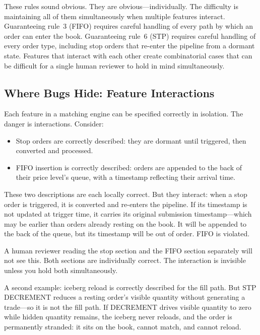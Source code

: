 \documentclass[11pt,a4paper]{article}
\begin{document}
These rules sound obvious. They are obvious---individually. The
difficulty is maintaining all of them simultaneously when multiple
features interact. Guaranteeing rule~3 (FIFO) requires careful handling
of every path by which an order can enter the book. Guaranteeing
rule~6 (STP) requires careful handling of every order type, including
stop orders that re-enter the pipeline from a dormant state. Features
that interact with each other create combinatorial cases that can be
difficult for a single human reviewer to hold in mind simultaneously.

\subsection{Where Bugs Hide: Feature Interactions}
\label{sec:feature-interactions}

Each feature in a matching engine can be specified correctly in
isolation. The danger is interactions. Consider:

\begin{itemize}[nosep]
\item Stop orders are correctly described: they are dormant until
      triggered, then converted and processed.
\item FIFO insertion is correctly described: orders are appended to the
      back of their price level's queue, with a timestamp reflecting
      their arrival time.
\end{itemize}

These two descriptions are each locally correct. But they interact:
when a stop order is triggered, it is converted and re-enters the
pipeline. If its timestamp is not updated at trigger time, it carries
its original submission timestamp---which may be earlier than orders
already resting on the book. It will be appended to the back of the
queue, but its timestamp will be out of order. FIFO is violated.

A human reviewer reading the stop section and the FIFO section
separately will not see this. Both sections are individually correct.
The interaction is invisible unless you hold both simultaneously.

A second example: iceberg reload is correctly described for the fill
path. But STP DECREMENT reduces a resting order's visible quantity
without generating a trade---so it is not the fill path. If DECREMENT
drives visible quantity to zero while hidden quantity remains, the
iceberg never reloads, and the order is permanently stranded: it sits
on the book, cannot match, and cannot reload.
\end{document}
